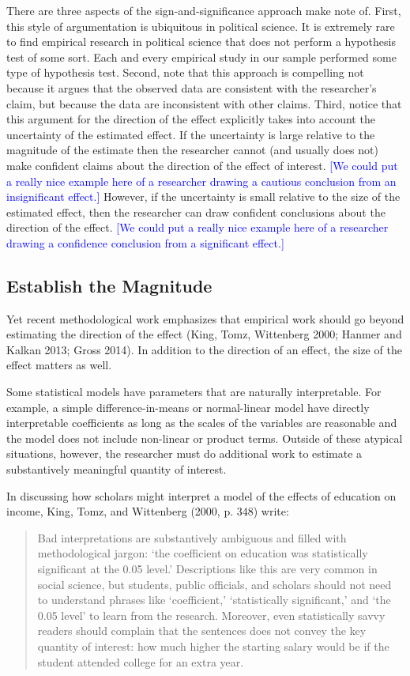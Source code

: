 \documentclass[12pt]{article}
\newcommand{\kelly}[1]{\textcolor{blue}{#1}}
\begin{document}
There are three aspects of the sign-and-significance approach make note of. First, this style of argumentation is ubiquitous in political science. It is extremely rare to find empirical research in political science that does not perform a hypothesis test of some sort. Each and every empirical study in our sample performed some type of hypothesis test. Second, note that this approach is compelling not because it argues that the observed data are consistent with the researcher's claim, but because the data are inconsistent with other claims. Third, notice that this argument for the direction of the effect explicitly takes into account the uncertainty of the estimated effect. If the uncertainty is large relative to the magnitude of the estimate then the researcher cannot (and usually does not) make confident claims about the direction of the effect of interest. \kelly{[We could put a really nice example here of a researcher drawing a cautious conclusion from an insignificant effect.]} However, if the uncertainty is small relative to the size of the estimated effect, then the researcher can draw confident conclusions about the direction of the effect. \kelly{[We could put a really nice example here of a researcher drawing a confidence conclusion from a significant effect.]}

\subsection*{Establish the Magnitude}

Yet recent methodological work emphasizes that empirical work should go beyond estimating the direction of the effect (King, Tomz, Wittenberg 2000; Hanmer and Kalkan 2013; Gross 2014). In addition to the direction of an effect, the size of the effect matters as well. 

Some statistical models have parameters that are naturally interpretable. For example, a simple difference-in-means or normal-linear model have directly interpretable coefficients as long as the scales of the variables are reasonable and the model does not include non-linear or product terms. Outside of these atypical situations, however, the researcher must do additional work to estimate a substantively meaningful quantity of interest.

In discussing how scholars might interpret a model of the effects of education on income, King, Tomz, and Wittenberg (2000, p. 348) write:

\begin{quote}
Bad interpretations are substantively ambiguous and filled with methodological jargon: `the coefficient on education was statistically significant at the 0.05 level.' Descriptions like this are very common in social science, but students, public officials, and scholars should not need to understand phrases like `coefficient,' `statistically significant,' and `the 0.05 level' to learn from the research. Moreover, even statistically savvy readers should complain that the sentences does not convey the key quantity of interest: how much higher the starting salary would be if the student attended college for an extra year.
\end{quote}
\end{document}
